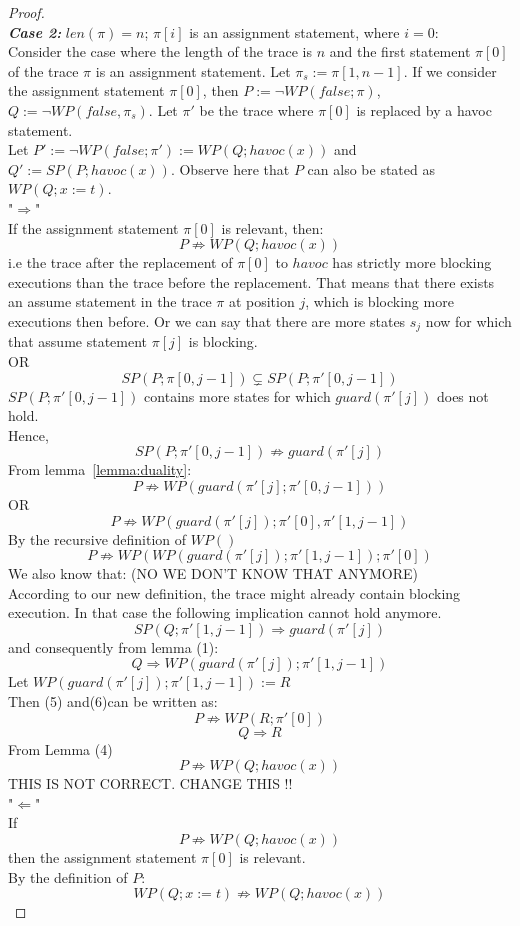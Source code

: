 \documentclass{article}
\newcommand{\limp}{\Rightarrow}
\begin{document}
\begin{proof}
\\
\textit{\textbf{Case 2:}} $len(\pi)=n$; $\pi[i]$ is an assignment statement, where $i=0$: \\
Consider the case where the length of the trace is $n$ and the first statement $\pi[0]$ of the trace $\pi$ is an assignment statement. Let $\pi_s := \pi[1,n-1]$. If we consider the assignment statement $\pi[0]$, then $P:= \neg WP(false; \pi)$, $Q:= \neg WP(false, \pi_s)$. Let $\pi'$ be the trace where $\pi[0]$ is replaced by a havoc statement.\\
Let $P' := \neg WP(false; \pi') := WP(Q; havoc(x))$ and $Q' := SP(P; havoc(x))$. Observe here that $P$ can also be stated as $WP(Q; x:=t)$.\\
"$\Rightarrow$"\\
If the assignment statement $\pi[0]$ is relevant, then:
$$P \not \limp WP(Q; havoc(x))$$
i.e the trace after the replacement of $\pi[0]$ to $havoc$ has strictly more blocking executions than the trace before the replacement. That means that there exists an assume statement in the trace $\pi$ at position $j$, which is blocking more executions then before. Or we can say that there are more states $s_j$ now for which that assume statement $\pi[j]$ is blocking.\\
OR
$$SP(P; \pi[0,j-1]) \subsetneq SP(P; \pi'[0,j-1])$$
$SP(P; \pi'[0,j-1])$ contains more states for which $guard(\pi'[j])$ does not hold. \\
Hence,
$$SP(P; \pi'[0,j-1]) \not \limp guard(\pi'[j])$$
From lemma~\ref{lemma:duality}:
$$P \not \limp WP(guard(\pi'[j]; \pi'[0,j-1]))$$
OR
$$P \not\limp WP(guard(\pi'[j]);\pi'[0],\pi'[1,j-1])$$
By the recursive definition of $WP()$
\begin{equation} 
P \not\limp WP( WP(guard(\pi'[j]);\pi'[1,j-1]);\pi'[0])
\end{equation}
We also know that: (NO WE DON'T KNOW THAT ANYMORE)\\
According to our new definition, the trace might already contain blocking execution. In that case the following implication cannot hold anymore. 
$$SP(Q; \pi'[1,j-1]) \limp guard(\pi'[j])$$
and consequently from lemma (1):
\begin{equation} 
Q \limp WP(guard(\pi'[j]); \pi'[1,j-1])
\end{equation}
Let $WP(guard(\pi'[j]); \pi'[1,j-1]) := R$\\
Then (5) and(6)can be written as:
$$P \not\limp WP( R;\pi'[0])$$
$$Q \limp R$$
From Lemma (4)
\begin{equation} 
P \not\limp WP(Q; havoc(x))
\end{equation}
THIS IS NOT CORRECT. CHANGE THIS !! \\
"$\Leftarrow$"\\
If 
$$P \not \limp WP(Q; havoc(x))$$
then the assignment statement $\pi[0]$ is relevant.\\
By the definition of $P$:
$$WP(Q; x:=t) \not \limp WP(Q; havoc(x))$$
\end{proof}
\end{document}
